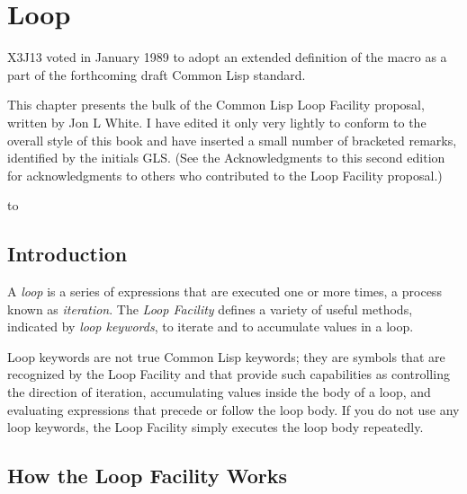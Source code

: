 
\clearpage\def\pagestatus{FINAL PROOF}


\chapter{Loop}
\label{LOOP}

\begin{new}
\prefaceword
X3J13 voted in January 1989
to adopt an extended definition of the  macro
as a part of the forthcoming draft Common Lisp standard.
\end{new}
This chapter presents the bulk of the Common Lisp
Loop Facility proposal, written by Jon L White.  I have
edited it only very lightly
to conform to the overall style of this book and have inserted a small
number of bracketed remarks, identified by the initials GLS.
(See the Acknowledgments to this second edition for
acknowledgments to others who contributed to the Loop Facility proposal.)

\noindent\hbox to \textwidth{\hss---Guy L. Steele Jr.}

\section{Introduction}

A {\it loop\/} is a series of expressions that are executed one or more times,
a process known as {\it iteration}.
The {\it Loop Facility\/} defines a
variety of useful methods, indicated by
{\it loop keywords}, to iterate and to
accumulate values in a loop.


Loop keywords are not true Common Lisp keywords; they are symbols that
are recognized by the Loop Facility and that provide such capabilities
as controlling the direction of iteration, accumulating values inside
the body of a loop, and evaluating expressions that precede or follow
the loop body.  If you do not use any loop keywords, the Loop Facility
simply executes the loop body repeatedly.


\section{How the Loop Facility Works}

